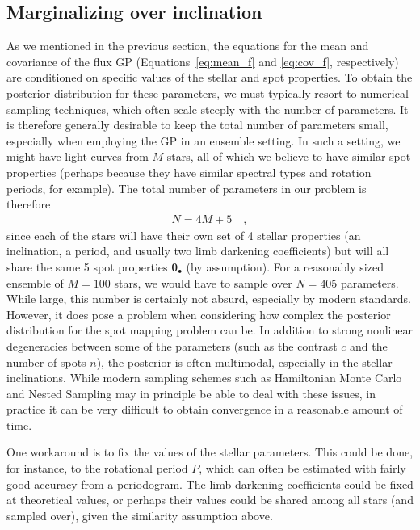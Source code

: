 \documentclass[modern]{aastex62}
\begin{document}
\subsection{Marginalizing over inclination}
\label{sec:inclination}
%
As we mentioned in the previous section,
the equations for the mean and covariance of the flux GP
(Equations~\ref{eq:mean_f} and \ref{eq:cov_f}, respectively) are conditioned
on specific values of the stellar and spot properties. To obtain the posterior distribution
for these parameters, we must typically resort to numerical sampling techniques,
which often scale steeply with the number of parameters. It is therefore generally
desirable to keep the total number of parameters small, especially when
employing the GP in an ensemble setting.
In such a setting, we might have light curves from $M$ stars, all of which
we believe to have similar spot properties (perhaps because they have
similar spectral types and rotation periods, for example).
The total number of parameters in our problem is therefore
%
\begin{align}
    N = 4 M + 5
    \quad,
\end{align}
%
since each of the stars will have their own set of 4 stellar properties
(an inclination, a period, and usually two limb darkening coefficients)
but will all share the same 5 spot properties
$\pmb{\theta}_\bullet$ (by assumption).
For a reasonably sized ensemble of $M=100$
stars, we would have to sample over $N = 405$ parameters.
While large, this number is certainly not absurd, especially by modern standards.
However, it does pose
a problem when considering how complex the posterior distribution for the
spot mapping problem can be. In addition to strong nonlinear degeneracies
between some of the parameters (such as the contrast $c$ and the
number of spots $n$), the posterior is often multimodal, especially in the
stellar inclinations. While modern sampling schemes such as Hamiltonian
Monte Carlo and Nested Sampling may in principle be able to deal with these
issues, in practice it can be very difficult to obtain convergence in a
reasonable amount of time.

One workaround is to fix the values of the stellar parameters. This could be done,
for instance, to the rotational period $P$, which can often be estimated with
fairly good accuracy from a periodogram. The limb darkening coefficients could
be fixed at theoretical values, or perhaps their values could be shared among
all stars (and sampled over), given the similarity assumption above.
\end{document}
